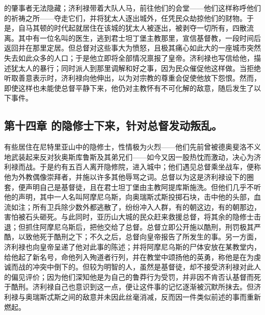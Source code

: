 的肇事者无法隐藏；济利禄带着大队人马，前往他们的会堂——他们这样称呼他们的祈祷之所——夺走它们，并将犹太人逐出城外，任凭民众劫掠他们的财物。\newline{}于是，自马其顿的时代起就居住在该城的犹太人被逐出，被剥夺一切所有，四散流离。\newline{}其中有一位名叫的医生，逃到君士坦丁堡主教那里，宣信基督教，一段时间后返回并在那里定居。\newline{}但总督对这些事大为愤怒，且极其痛心如此大的一座城市突然失去如此众多的人口；于是他立即将全部情况禀报了皇帝。\newline{}济利禄也写信给他，描述犹太人的暴行；同时派人到那里调解和好之事，因为民众催促他这样做。\newline{}当拒绝听取善意表示时，济利禄向他伸出，以为对宗教的尊重会促使他放下怨恨。\newline{}然而，即使这样也未能使总督平静下来，他仍对主教怀有不可化解的敌意，随后发生了以下事件。\par


\subsection{第十四章 的隐修士下来，针对总督发动叛乱。}

有些居住在尼特里亚山中的隐修士，性情极为火烈——他们先前曾被德奥斐洛不义地武装起来反对狄奥斯库鲁斯及其弟兄们——如今又因一股热忱而激动，决心为济利禄而战。于是约有五百人离开隐修院，进入城中；他们遇见总督乘坐战车，便称他为外教偶像崇拜者，并施以许多其他辱骂之词。总督以为这是济利禄设下的圈套，便声明自己是基督徒，且在君士坦丁堡由主教阿提库斯施洗。但他们几乎不听他的声明，其中一人名叫阿摩尼乌斯，向奥瑞斯忒斯投掷石块，击中他的头部，血流如注；所有卫兵除少数外都逃散了，纷纷冲入人群，有的朝这边，有的朝那边，害怕被石头砸死。与此同时，亚历山大城的民众赶来救援总督，将其余的隐修士击退；但抓住阿摩尼乌斯后，把他交给了总督。总督立即公开施以酷刑，刑罚极其严酷，以致他死于酷刑之下；不久之后，总督向皇帝报告了所发生的事。另一方面，济利禄也向皇帝呈递了他对此事的陈述；并将阿摩尼乌斯的尸体安放在某教堂内，给他起了新名号，命他列入殉道者行列，并在教堂中颂扬他的英勇，称他是在为虔诚而战的冲突中倒下的。但较为明智的人，虽然是基督徒，却不接受济利禄对此人的偏见评价；因为他们深知他是为自己的鲁莽行为受罚，并非因不肯否认基督而死于酷刑。济利禄自己也意识到这一点，便让这件事的记忆逐渐被沉默所抹去。但济利禄与奥瑞斯忒斯之间的敌意并未因此丝毫消减，反而因一件类似前述的事而重新燃起。\par

